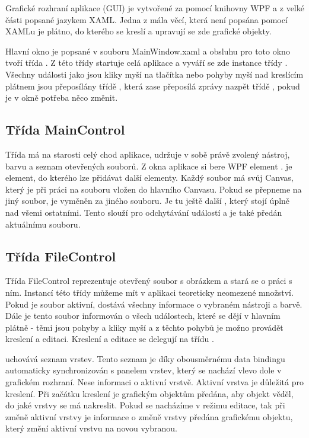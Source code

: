 \documentclass[
  field=inf,
  biblatex=false,
  glossaries,
  index
]{kidiplom}
\begin{document}
Grafické rozhraní aplikace (GUI) je vytvořené za pomocí knihovny WPF a z velké části popsané jazykem XAML. Jedna z mála věcí, která není popsána pomocí XAMLu je plátno, do kterého se kreslí a upravují se zde grafické objekty.

Hlavní okno je popsané v souboru MainWindow.xaml a obsluhu pro toto okno tvoří třída . Z této třídy startuje celá aplikace a vyváří se zde instance třídy . Všechny události jako jsou kliky myší na tlačítka nebo pohyby myší nad kreslícím plátnem jsou přeposílány třídě , která zase přeposílá zprávy nazpět třídě , pokud je v okně potřeba něco změnit.

\subsection{Třída MainControl}

Třída  má na starosti celý chod aplikace, udržuje v sobě právě zvolený nástroj, barvu a seznam otevřených souborů. Z okna aplikace si bere WPF element .  je element, do kterého lze přidávat další elementy. Každý soubor má svůj Canvas, který je při práci na souboru vložen do hlavního Canvasu. Pokud se přepneme na jiný soubor,  je vyměněn za  jiného souboru. Je tu ještě další , který stojí úplně nad všemi ostatními. Tento  slouží pro odchytávání událostí a je také předán aktuálnímu souboru.

\subsection{Třída FileControl}

Třída FileControl reprezentuje otevřený soubor s obrázkem a stará se o práci s ním. Instancí této třídy můžeme mít v aplikaci teoreticky neomezené množství. Pokud je soubor aktivní, dostává všechny informace o vybraném nástroji a barvě. Dále je tento soubor informován o všech událostech, které se dějí v hlavním plátně - těmi jsou pohyby a kliky myší a z těchto pohybů je možno provádět kreslení a editaci. Kreslení a editace se delegují na třídu .

 uchovává seznam vrstev. Tento seznam je díky obousměrnému data bindingu automaticky synchronizován s panelem vrstev, který se nachází vlevo dole v grafickém rozhraní. Nese informaci o aktivní vrstvě. Aktivní vrstva je důležitá pro kreslení. Při začátku kreslení je grafickým objektům předána, aby objekt věděl, do jaké vrstvy se má nakreslit. Pokud se nacházíme v režimu editace, tak při změně aktivní vrstvy je informace o změně vrstvy předána grafickému objektu, který změní aktivní vrstvu na novou vybranou.
\end{document}
